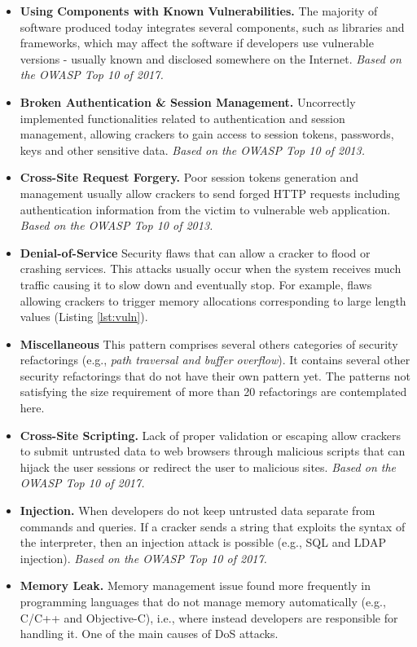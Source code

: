 \documentclass[10pt,conference]{IEEEtran}
\begin{document}
\begin{itemize}
	\item \textbf{Using Components with Known Vulnerabilities.} The majority of software produced today integrates several components, such as libraries and frameworks, which may affect the software if developers use vulnerable versions - usually known and disclosed somewhere on the Internet. \textit{Based on the OWASP Top 10 of 2017.}
	\item \textbf{Broken Authentication \& Session Management.} Uncorrectly implemented functionalities related to authentication and session management, allowing crackers to gain access to session tokens, passwords, keys and other sensitive data. \textit{Based on the OWASP Top 10 of 2013.}
	\item \textbf{Cross-Site Request Forgery.} Poor session tokens generation and management usually allow crackers to send forged HTTP requests including authentication information from the victim to vulnerable web application. \textit{Based on the OWASP Top 10 of 2013.}
	\item \textbf{Denial-of-Service} Security flaws that can allow a cracker to flood or crashing services. This attacks usually occur when the system receives much traffic causing it to slow down and eventually stop. For example, flaws allowing crackers to trigger memory allocations corresponding to large length values (Listing \ref{lst:vuln}).
	\item \textbf{Miscellaneous} This pattern comprises several others categories of security refactorings (e.g., \textit{path traversal and buffer overflow}). It contains several other security refactorings that do not have their own pattern yet. The patterns not satisfying the size requirement of more than 20 refactorings are contemplated here.
	\item \textbf{Cross-Site Scripting.} Lack of proper validation or escaping allow crackers to submit untrusted data to web browsers through malicious scripts that can hijack the user sessions or redirect the user to malicious sites. \textit{Based on the OWASP Top 10 of 2017.}
	\item \textbf{Injection.} When developers do not keep untrusted data separate from commands and queries. If a cracker sends a string that exploits the syntax of the interpreter, then an injection attack is possible (e.g., SQL and LDAP injection). \textit{Based on the OWASP Top 10 of 2017.}
	\item \textbf{Memory Leak.} Memory management issue found more frequently in programming languages that do not manage memory automatically (e.g., C/C++ and Objective-C), i.e., where instead developers are responsible for handling it. One of the main causes of DoS attacks.
\end{itemize}
\end{document}
